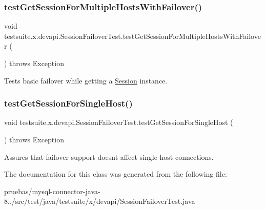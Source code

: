 \subsubsection{\texorpdfstring{test\+Get\+Session\+For\+Multiple\+Hosts\+With\+Failover()}{testGetSessionForMultipleHostsWithFailover()}}
{\footnotesize\ttfamily void testsuite.\+x.\+devapi.\+Session\+Failover\+Test.\+test\+Get\+Session\+For\+Multiple\+Hosts\+With\+Failover (\begin{DoxyParamCaption}{ }\end{DoxyParamCaption}) throws Exception}

Tests basic failover while getting a \mbox{\hyperlink{}{Session}} instance. \mbox{\label{classtestsuite_1_1x_1_1devapi_1_1_session_failover_test_a7bada9d526863798fc56ec329319b703}} 
\subsubsection{\texorpdfstring{test\+Get\+Session\+For\+Single\+Host()}{testGetSessionForSingleHost()}}
{\footnotesize\ttfamily void testsuite.\+x.\+devapi.\+Session\+Failover\+Test.\+test\+Get\+Session\+For\+Single\+Host (\begin{DoxyParamCaption}{ }\end{DoxyParamCaption}) throws Exception}

Assures that failover support doesn\textquotesingle{}t affect single host connections. 

The documentation for this class was generated from the following file\+:\begin{DoxyCompactItemize}
\item 
pruebas/mysql-\/connector-\/java-\/8../src/test/java/testsuite/x/devapi/Session\+Failover\+Test.\+java\end{DoxyCompactItemize}
